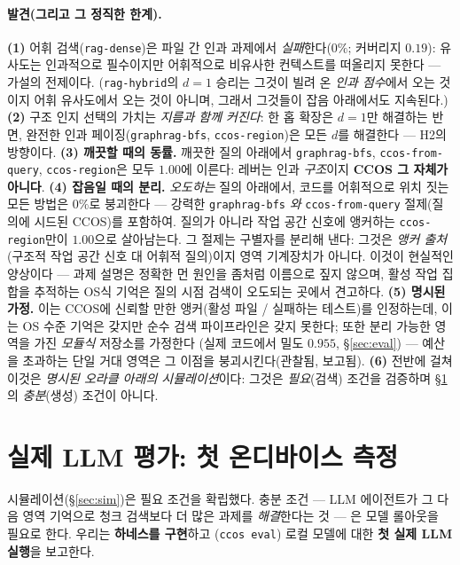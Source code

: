\documentclass[11pt]{article}
\newcommand{\code}[1]{\texttt{#1}}
\begin{document}
\paragraph{발견(그리고 그 정직한 한계).}
\textbf{(1)} 어휘 검색(\code{rag-dense})은 파일 간 인과 과제에서 \emph{실패}한다($0\%$; 커버리지 $0.19$):
유사도는 인과적으로 필수이지만 어휘적으로 비유사한 컨텍스트를 떠올리지 못한다 --- 가설의 전제이다.
(\code{rag-hybrid}의 $d{=}1$ 승리는 그것이 빌려 온 \emph{인과 점수}에서 오는 것이지 어휘 유사도에서 오는 것이
아니며, 그래서 그것들이 잡음 아래에서도 지속된다.)
\textbf{(2)} 구조 인지 선택의 가치는 \emph{지름과 함께 커진다}: 한 홉 확장은 $d{=}1$만 해결하는 반면, 완전한 인과
페이징(\code{graphrag-bfs}, \code{ccos-region})은 모든 $d$를 해결한다 --- H2의 방향이다.
\textbf{(3) 깨끗할 때의 동률.} 깨끗한 질의 아래에서 \code{graphrag-bfs}, \code{ccos-from-query},
\code{ccos-region}은 모두 $1.00$에 이른다: 레버는 인과 \emph{구조}이지 \textbf{CCOS 그 자체가 아니다}.
\textbf{(4) 잡음일 때의 분리.} \emph{오도하는} 질의 아래에서, 코드를 어휘적으로 위치 짓는 모든 방법은 $0\%$로
붕괴한다 --- 강력한 \code{graphrag-bfs} \emph{와} \code{ccos-from-query} 절제(질의에 시드된 CCOS)를 포함하여.
질의가 아니라 작업 공간 신호에 앵커하는 \code{ccos-region}만이 $1.00$으로 살아남는다. 그 절제는 구별자를 분리해
낸다: 그것은 \emph{앵커 출처}(구조적 작업 공간 신호 대 어휘적 질의)이지 영역 기계장치가 아니다. 이것이 현실적인
양상이다 --- 과제 설명은 정확한 먼 원인을 좀처럼 이름으로 짚지 않으며, 활성 작업 집합을 추적하는 OS식 기억은 질의
시점 검색이 오도되는 곳에서 견고하다.
\textbf{(5) 명시된 가정.} 이는 CCOS에 신뢰할 만한 앵커(활성 파일 / 실패하는 테스트)를 인정하는데, 이는 OS 수준
기억은 갖지만 순수 검색 파이프라인은 갖지 못한다; 또한 분리 가능한 영역을 가진 \emph{모듈식} 저장소를 가정한다
(실제 코드에서 밀도 $0.955$, \S\ref{sec:eval}) --- 예산을 초과하는 단일 거대 영역은 그 이점을 붕괴시킨다(관찰됨,
보고됨).
\textbf{(6)} 전반에 걸쳐 이것은 \emph{명시된 오라클 아래의 시뮬레이션}이다: 그것은 \emph{필요}(검색) 조건을
검증하며 \S\ref{sec:protocol}의 \emph{충분}(생성) 조건이 아니다.

\section{실제 LLM 평가: 첫 온디바이스 측정}\label{sec:protocol}

시뮬레이션(\S\ref{sec:sim})은 필요 조건을 확립했다. 충분 조건 --- LLM 에이전트가 그 다음 영역 기억으로 청크
검색보다 더 많은 과제를 \emph{해결}한다는 것 --- 은 모델 롤아웃을 필요로 한다. 우리는 \textbf{하네스를 구현}하고
(\code{ccos eval}) 로컬 모델에 대한 \textbf{첫 실제 LLM 실행}을 보고한다.
\end{document}
